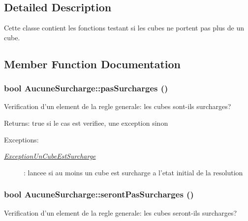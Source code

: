 \subsection{Detailed Description}
Cette classe contient les fonctions testant si les cubes ne portent pas plus de un cube. 

\subsection{Member Function Documentation}
\hypertarget{classAucuneSurcharge_985f14cd31785475866dc1081a41e2e1}{
\subsubsection[{pasSurcharges}]{\setlength{\rightskip}{0pt plus 5cm}bool AucuneSurcharge::pasSurcharges ()}}
\label{classAucuneSurcharge_985f14cd31785475866dc1081a41e2e1}


Verification d'un element de la regle generale: les cubes sont-ils surcharges? 

\begin{Desc}
\item[Returns:]true si le cas est verifiee, une exception sinon \end{Desc}
\begin{Desc}
\item[Exceptions:]
\begin{description}
\item[{\em \hyperlink{classExceptionUnCubeEstSurcharge}{ExceptionUnCubeEstSurcharge}}]: lancee si au moins un cube est surcharge a l'etat initial de la resolution \end{description}
\end{Desc}
\hypertarget{classAucuneSurcharge_a866df9a186c7b922890cf00af2b58e2}{
\subsubsection[{serontPasSurcharges}]{\setlength{\rightskip}{0pt plus 5cm}bool AucuneSurcharge::serontPasSurcharges ()}}
\label{classAucuneSurcharge_a866df9a186c7b922890cf00af2b58e2}


Verification d'un element de la regle generale: les cubes seront-ils surcharges? 

